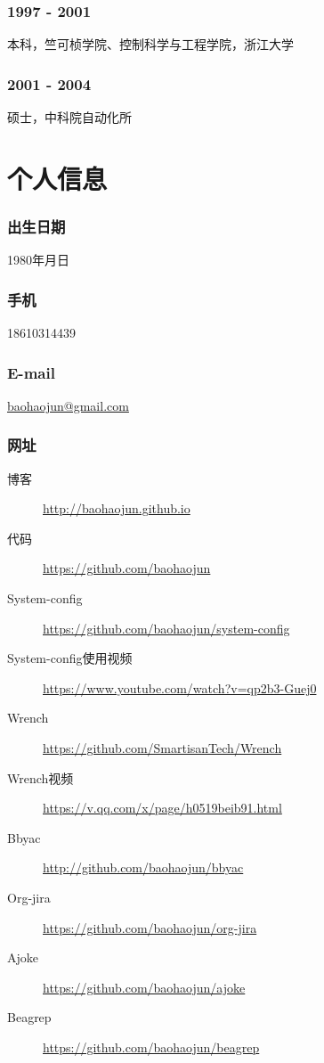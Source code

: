 \documentclass[11pt,dvipdfmx,CJKbookmarks]{article}
\begin{document}
\begin{CJK*}{UTF8}{simsun}
\subsubsection{1997 - 2001}
\label{sec:org59613e3}
本科，竺可桢学院、控制科学与工程学院，浙江大学
\subsubsection{2001 - 2004}
\label{sec:org33efaa3}
硕士，中科院自动化所

\section{个人信息}
\label{sec:org9b378f6}
\subsubsection{出生日期}
\label{sec:org4a94583}
1980\thinspace 年\thinspace 月\thinspace 日
\subsubsection{手机}
\label{sec:org7133008}
18610314439
\subsubsection{E-mail}
\label{sec:org4a06874}
\href{mailto:baohaojun@gmail.com}{baohaojun@gmail.com}
\subsubsection{网址}
\label{sec:orgce54321}
\begin{description}
\item[{博客}] \url{http://baohaojun.github.io}
\item[{代码}] \url{https://github.com/baohaojun}
\item[{System-config}] \url{https://github.com/baohaojun/system-config}
\item[{System-config\thinspace 使用视频}] \url{https://www.youtube.com/watch?v=qp2b3-Guej0}
\item[{Wrench}] \url{https://github.com/SmartisanTech/Wrench}
\item[{Wrench\thinspace 视频}] \url{https://v.qq.com/x/page/h0519beib91.html}
\item[{Bbyac}] \url{http://github.com/baohaojun/bbyac}
\item[{Org-jira}] \url{https://github.com/baohaojun/org-jira}
\item[{Ajoke}] \url{https://github.com/baohaojun/ajoke}
\item[{Beagrep}] \url{https://github.com/baohaojun/beagrep}
\end{description}
\end{CJK*}
\end{document}
